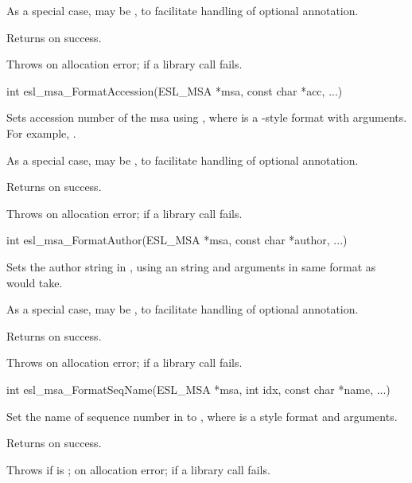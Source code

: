 \begin{sreapi}
As a special case,  may be , to facilitate
handling of optional annotation.

Returns  on success.

Throws  on allocation error;
 if a  library call fails.


\hypertarget{func:esl_msa_FormatAccession()}
{\item[int esl\_msa\_FormatAccession(ESL\_MSA *msa, const char *acc, ...)]}

Sets accession number of the msa  using , 
where  is a -style format with arguments.
For example, .

As a special case,  may be , to facilitate
handling of optional annotation.

Returns  on success.

Throws  on allocation error;
 if a  library call fails.


\hypertarget{func:esl_msa_FormatAuthor()}
{\item[int esl\_msa\_FormatAuthor(ESL\_MSA *msa, const char *author, ...)]}

Sets the author string in , using an  string
and arguments in same format as  would take.

As a special case,  may be , to facilitate
handling of optional annotation.

Returns  on success.

Throws  on allocation error;
 if a  library call fails.


\hypertarget{func:esl_msa_FormatSeqName()}
{\item[int esl\_msa\_FormatSeqName(ESL\_MSA *msa, int idx, const char *name, ...)]}

Set the name of sequence number  in 
to , where  is a 
style format and arguments.

Returns  on success.

Throws  if  is ;
 on allocation error;
 if a  library call fails.




\end{sreapi}
